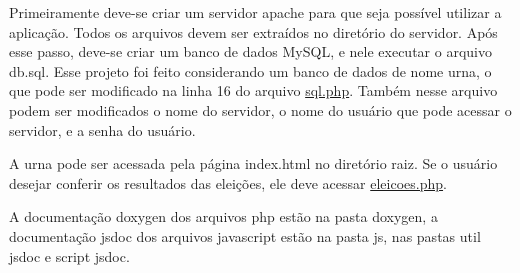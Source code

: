 Primeiramente deve-\/se criar um servidor apache para que seja possível utilizar a aplicação. Todos os arquivos devem ser extraídos no diretório do servidor. Após esse passo, deve-\/se criar um banco de dados My\+SQL, e nele executar o arquivo \textquotesingle{}db.\+sql\textquotesingle{}. Esse projeto foi feito considerando um banco de dados de nome \textquotesingle{}urna\textquotesingle{}, o que pode ser modificado na linha 16 do arquivo \textquotesingle{}\mbox{\hyperlink{sql_8php}{sql.\+php}}\textquotesingle{}. Também nesse arquivo podem ser modificados o nome do servidor, o nome do usuário que pode acessar o servidor, e a senha do usuário.

A urna pode ser acessada pela página \textquotesingle{}index.\+html\textquotesingle{} no diretório raiz. Se o usuário desejar conferir os resultados das eleições, ele deve acessar \textquotesingle{}\mbox{\hyperlink{eleicoes_8php}{eleicoes.\+php}}\textquotesingle{}.

A documentação doxygen dos arquivos php estão na pasta \textquotesingle{}doxygen\textquotesingle{}, a documentação jsdoc dos arquivos javascript estão na pasta \textquotesingle{}js\textquotesingle{}, nas pastas \textquotesingle{}util jsdoc\textquotesingle{} e \textquotesingle{}script jsdoc\textquotesingle{}. 